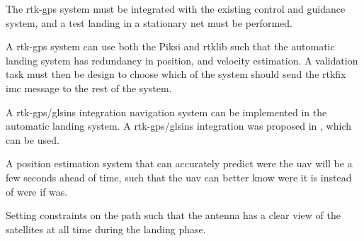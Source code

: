 The \gls{rtk-gps} system must be integrated with the existing control and guidance system, and a test landing in a stationary net must be performed. 

A \gls{rtk-gps} system can use both the Piksi and \gls{rtklib} such that the automatic landing system has redundancy in position, and velocity estimation. A validation task must then be design to choose which of the system should send the rtkfix \gls{imc} message to the rest of the system.

A \gls{rtk-gps}/gls{ins} integration navigation system can be implemented in the automatic landing system. A \gls{rtk-gps}/gls{ins} integration was proposed in \citep{Spockeli}, which can be used.

A position estimation system that can accurately predict were the \gls{uav} will be a few seconds ahead of time, such that the \gls{uav} can better know were it is instead of were if was.

Setting constraints on the path such that the antenna has a clear view of the satellites at all time during the landing phase. 
\cleardoublepage